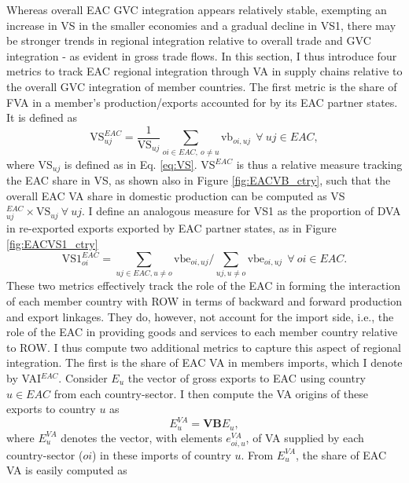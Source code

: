 \documentclass[a4paper]{article}
\begin{document}
Whereas overall EAC GVC integration appears relatively stable, exempting an increase in VS in the smaller economies and a gradual decline in VS1, there may be stronger trends in regional integration relative to overall trade and GVC integration - as evident in gross trade flows. In this section, I thus introduce four metrics to track EAC regional integration through VA in supply chains relative to the overall GVC integration of member countries. The first metric is the share of FVA in a member's production/exports accounted for by its EAC partner states. It is defined as 
%
\begin{equation} \label{eq:VS_EAC}
\text{VS}_{uj}^{EAC} = \frac{1}{\text{VS}_{uj}}  \sum_{oi \in EAC,\ o \neq  u} \text{vb}_{oi, uj}   \ \ \forall\ uj \in EAC,
\end{equation} 
%
\noindent where VS$_{uj}$ is defined as in Eq. \ref{eq:VS}. VS$^{EAC}$ is thus a relative measure tracking the EAC share in VS, as shown also in Figure \ref{fig:EACVB_ctry}, such that the overall EAC VA share in domestic production can be computed as VS$_{uj}^{EAC} \times \text{VS}_{uj} \ \forall\ uj$. I define an analogous measure for VS1 as the proportion of DVA in re-exported exports exported by EAC partner states, as in Figure \ref{fig:EACVS1_ctry}
%
\begin{equation} \label{eq:VS1_EAC}
\text{VS1}_{oi}^{EAC} =  \sum_{uj \in EAC, u \neq  o} \text{vbe}_{oi, uj} \bigg/ \sum_{uj, u \neq  o} \text{vbe}_{oi, uj}\ \ \forall\ oi \in EAC.
\end{equation}
%
These two metrics effectively track the role of the EAC in forming the interaction of each member country with ROW in terms of backward and forward production and export linkages. They do, however, not account for the import side, i.e., the role of the EAC in providing goods and services to each member country relative to ROW. I thus compute two additional metrics to capture this aspect of regional integration. The first is the share of EAC VA in members imports, which I denote by VAI$^{EAC}$. Consider $E_u$ the vector of gross exports to EAC using country $u \in EAC$ from each country-sector. %
I then compute the VA origins of these exports to country $u$ as 
%
\begin{equation}
E_u^{VA} = \textbf{VB}E_u,
\end{equation}
%
\noindent where $E_u^{VA}$ denotes the vector, with elements $e_{oi, u}^{VA}$, of VA supplied by each country-sector ($oi$) in these imports of country $u$. From  $E_u^{VA}$, the share of EAC VA is easily computed as 
\end{document}
